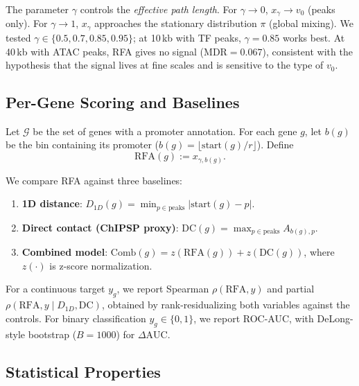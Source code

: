 \documentclass[11pt,a4paper]{article}
\begin{document}
The parameter $\gamma$ controls the \emph{effective path length}. For $\gamma \to 0$, $x_\gamma \to v_0$ (peaks only). For $\gamma \to 1$, $x_\gamma$ approaches the stationary distribution $\pi$ (global mixing). We tested $\gamma \in \{0.5, 0.7, 0.85, 0.95\}$; at 10\,kb with TF peaks, $\gamma = 0.85$ works best. At 40\,kb with ATAC peaks, RFA gives no signal (MDR$=0.067$), consistent with the hypothesis that the signal lives at fine scales and is sensitive to the type of $v_0$.

\subsection{Per-Gene Scoring and Baselines}

Let $\mathcal{G}$ be the set of genes with a promoter annotation. For each gene $g$, let $b(g)$ be the bin containing its promoter ($b(g) = \lfloor \mathrm{start}(g)/r \rfloor$). Define
\begin{equation}
\mathrm{RFA}(g) := x_{\gamma, b(g)}.
\end{equation}

We compare RFA against three baselines:
\begin{enumerate}
    \item \textbf{1D distance}: $D_{1D}(g) = \min_{p \in \mathrm{peaks}} |\mathrm{start}(g) - p|$.
    \item \textbf{Direct contact (ChIPSP proxy)}: $\mathrm{DC}(g) = \max_{p \in \mathrm{peaks}} A_{b(g), p}$.
    \item \textbf{Combined model}: $\mathrm{Comb}(g) = z(\mathrm{RFA}(g)) + z(\mathrm{DC}(g))$, where $z(\cdot)$ is z-score normalization.
\end{enumerate}

For a continuous target $y_g$, we report Spearman $\rho(\mathrm{RFA}, y)$ and partial $\rho(\mathrm{RFA}, y \mid D_{1D}, \mathrm{DC})$, obtained by rank-residualizing both variables against the controls. For binary classification $y_g \in \{0,1\}$, we report ROC-AUC, with DeLong-style bootstrap ($B=1000$) for $\Delta \mathrm{AUC}$.

\subsection{Statistical Properties}
\end{document}
